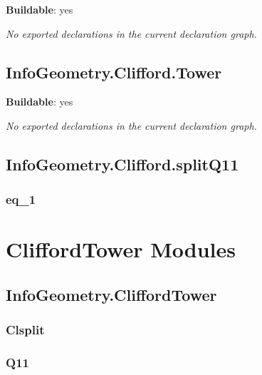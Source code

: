 \noindent\textbf{Buildable}: yes

\noindent\emph{No exported declarations in the current declaration graph.}

\section{InfoGeometry.Clifford.Tower}

\noindent\textbf{Buildable}: yes

\noindent\emph{No exported declarations in the current declaration graph.}

\section{InfoGeometry.Clifford.splitQ11}

\subsection*{eq_1}

\begin{theorem}[blueprint="infogeometry:clifford:splitq11:eq_1"]
\end{theorem}

\chapter{CliffordTower Modules}

\section{InfoGeometry.CliffordTower}

\subsection*{Clsplit}

\begin{theorem}[blueprint="infogeometry:cliffordtower:clsplit"]
\end{theorem}

\subsection*{Q11}

\begin{theorem}[blueprint="infogeometry:cliffordtower:q11"]
\end{theorem}

